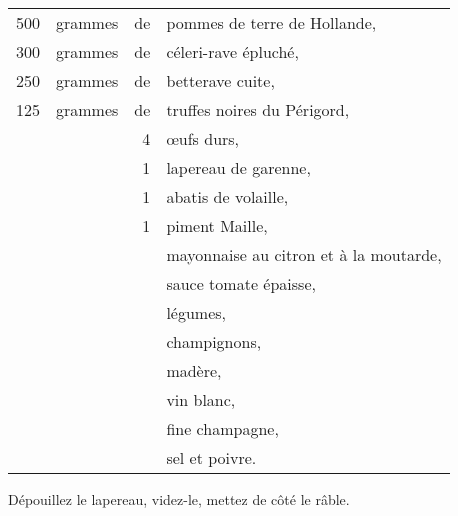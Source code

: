 \footnotesize
\begin{longtable}{rrrp{16em}}
    500 & grammes & de & pommes de terre de Hollande,                                                     \\
    300 & grammes & de & céleri-rave épluché,                                                             \\
    250 & grammes & de & betterave cuite,                                                                 \\
    125 & grammes & de & truffes noires du Périgord,                                                      \\
        &         &  4 & œufs durs,                                                                       \\
        &         &  1 & lapereau de garenne,                                                             \\
        &         &  1 & abatis de volaille,                                                              \\
        &         &  1 & piment Maille,                                                                   \\
        &         &    & mayonnaise au citron et à la moutarde,                                           \\
        &         &    & sauce tomate épaisse,                                                            \\
        &         &    & légumes,                                                                         \\
        &         &    & champignons,                                                                     \\
        &         &    & madère,                                                                          \\
        &         &    & vin blanc,                                                                       \\
        &         &    & fine champagne,                                                                  \\
        &         &    & sel et poivre.                                                                   \\
\end{longtable}
\normalsize

Dépouillez le lapereau, videz-le, mettez de côté le râble.

